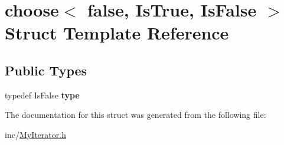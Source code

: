\hypertarget{structchoose_3_01false_00_01IsTrue_00_01IsFalse_01_4}{}\section{choose$<$ false, Is\+True, Is\+False $>$ Struct Template Reference}
\label{structchoose_3_01false_00_01IsTrue_00_01IsFalse_01_4}
\subsection*{Public Types}
\begin{DoxyCompactItemize}
\item 
\mbox{\label{structchoose_3_01false_00_01IsTrue_00_01IsFalse_01_4_a20db37b146c2468c57f51a416b47ed0a}} 
typedef Is\+False {\bfseries type}
\end{DoxyCompactItemize}


The documentation for this struct was generated from the following file\+:\begin{DoxyCompactItemize}
\item 
inc/\hyperlink{MyIterator_8h}{My\+Iterator.\+h}\end{DoxyCompactItemize}
